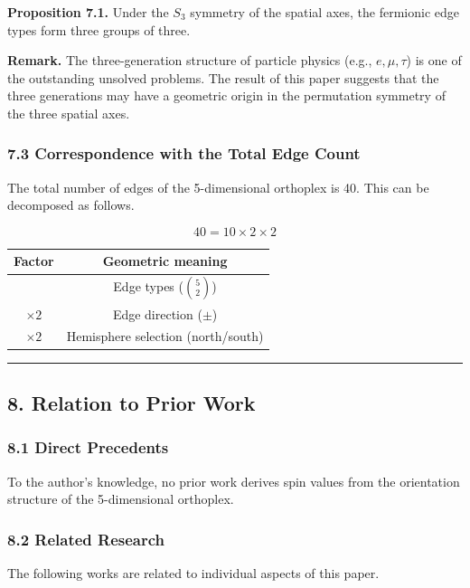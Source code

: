 \documentclass[a4paper,11pt]{article}
\newcounter{none}
\begin{document}
\textbf{Proposition 7.1.} Under the $S_3$ symmetry of the spatial axes, the fermionic edge types form three groups of three.

\textbf{Remark.} The three-generation structure of particle physics (e.g., $e, \mu, \tau$) is one of the outstanding unsolved problems. The result of this paper suggests that the three generations may have a geometric origin in the permutation symmetry of the three spatial axes.

\subsubsection*{7.3 Correspondence with the Total Edge Count}

The total number of edges of the 5-dimensional orthoplex is 40. This can be decomposed as follows.

\[40 = 10 \times 2 \times 2\]

{\def\LTcaptype{none}
\begin{longtable}[]{@{}cc@{}}
\toprule
Factor & Geometric meaning \\
\midrule
\endhead
\bottomrule
\endlastfoot
10 & Edge types ($\binom{5}{2}$) \\
$\times 2$ & Edge direction ($\pm$) \\
$\times 2$ & Hemisphere selection (north/south) \\
\end{longtable}
}

\begin{center}\rule{0.5\linewidth}{0.5pt}\end{center}

\subsection*{8. Relation to Prior Work}

\subsubsection*{8.1 Direct Precedents}

To the author's knowledge, no prior work derives spin values from the orientation structure of the 5-dimensional orthoplex.

\subsubsection*{8.2 Related Research}

The following works are related to individual aspects of this paper.
\end{document}
